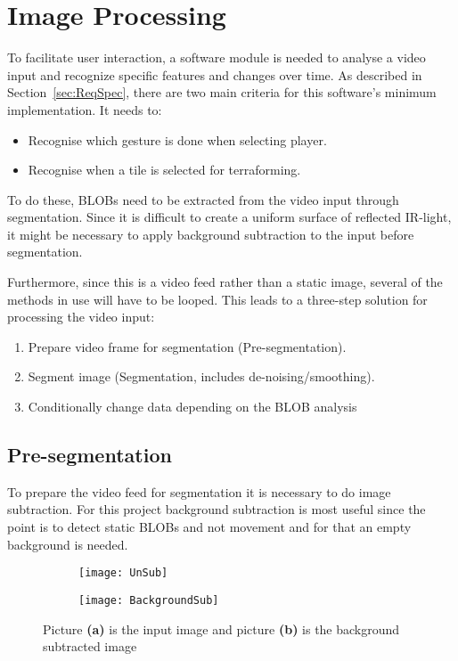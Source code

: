 \section{Image Processing}
To facilitate user interaction, a software module is needed to analyse a video input and recognize specific features and changes over time. As described in Section~\ref{sec:ReqSpec}, there are two main criteria for this software's minimum implementation. It needs to:
\begin{itemize}
\item Recognise which gesture is done when selecting player.
\item Recognise when a tile is selected for terraforming.
\end{itemize}

To do these, BLOBs need to be extracted from the video input through segmentation. Since it is difficult to create a uniform surface of reflected IR-light, it might be necessary to apply background subtraction to the input before segmentation. 

Furthermore, since this is a video feed rather than a static image, several of the methods in use will have to be looped. This leads to a three-step solution for processing the video input:

\begin{enumerate}
\item Prepare video frame for segmentation (Pre-segmentation).
\item Segment image (Segmentation, includes de-noising/smoothing).
\item Conditionally change data depending on the BLOB analysis
\end{enumerate}

\subsection{Pre-segmentation}
To prepare the video feed for segmentation it is necessary to do image subtraction. For this project background subtraction is most useful since the point is to detect static BLOBs and not movement and for that an empty background is needed. 

\begin{figure}
	\centering
	\begin{subfigure}[b]{0.3\textwidth}
	\texttt{[image: UnSub]}
		\caption{\label{Fig:UnSub}}
	\end{subfigure}
	\begin{subfigure}[b]{0.3\textwidth}
	\texttt{[image: BackgroundSub]}
		\caption{\label{Fig:BackgroundSub}}
	\end{subfigure}
	\caption{Picture \textbf{(a)} is the input image and picture \textbf{(b)} is the background subtracted image\label{Fig:Subtract}}
\end{figure}

